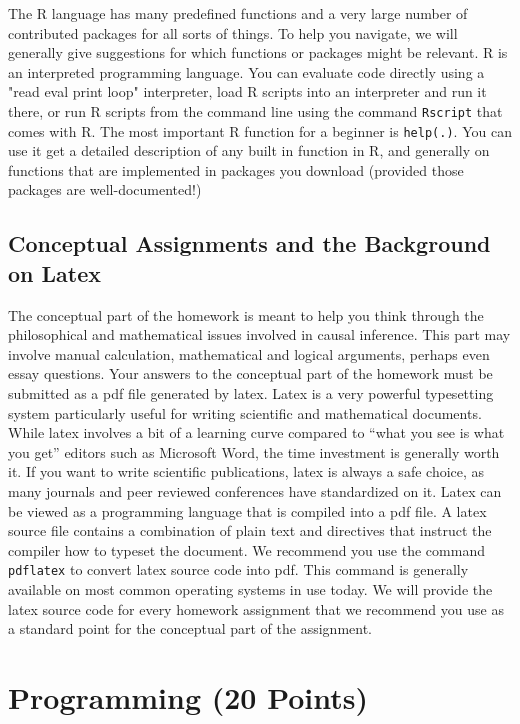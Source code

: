 \documentclass[11pt]{article}
\begin{document}
The R language has many predefined functions and a very large number of contributed packages for all sorts of things.  To help you navigate, we will generally give suggestions for which functions or packages might be relevant.  R is an interpreted programming language.  You can evaluate code directly using a "read eval print loop" interpreter, load R scripts into an interpreter and run it there, or run R scripts from the command line using the command \texttt{Rscript} that comes with R.  The most important R function for a beginner is \texttt{help(.)}.  You can use it get a detailed description of any built in function in R, and generally on functions that are implemented in packages you download (provided those packages are well-documented!)

\subsection{Conceptual Assignments and the Background on Latex}

The conceptual part of the homework is meant to help you think through the philosophical and mathematical issues involved in causal inference.
This part may involve manual calculation, mathematical and logical arguments, perhaps even essay questions.  Your answers to the conceptual
part of the homework must be submitted as a pdf file generated by latex.  Latex is a very powerful typesetting system particularly useful for writing scientific and mathematical documents.  While latex involves a bit of a learning curve compared to ``what you see is what you get'' editors such as Microsoft Word, the time investment is generally worth it.  If you want to write scientific publications, latex is always a safe choice, as many journals and peer reviewed conferences have standardized on it.  Latex can be viewed as a programming language that is compiled into a pdf file.
A latex source file contains a combination of plain text and directives that instruct the compiler how to typeset the document.  We recommend you use the command \texttt{pdflatex} to convert latex source code into pdf.  This command is generally available on most common operating systems in use today.  We will provide the latex source code for every homework assignment that we recommend you use as a standard point for the conceptual part of the assignment.

\section{Programming (20 Points)}
\end{document}
